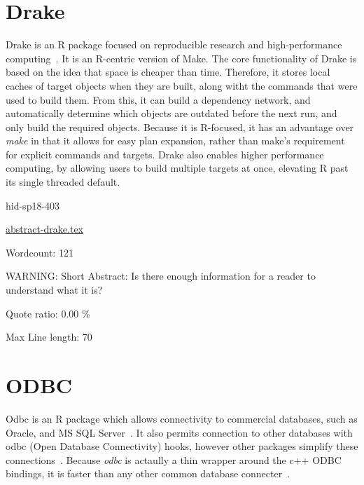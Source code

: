 \section{Drake}

Drake is an R package focused on reproducible research and
high-performance computing~\cite{hid-sp18-403-R-drake}. It is an
R-centric version of Make. The core functionality of Drake is based on
the idea that space is cheaper than time.  Therefore, it stores local
caches of target objects when they are built, along witht the commands
that were used to build them. From this, it can build a dependency
network, and automatically determine which objects are outdated before
the next run, and only build the required objects. Because it is
R-focused, it has an advantage over \textit{make} in that it allows
for easy plan expansion, rather than make’s requirement for explicit
commands and targets.  Drake also enables higher performance
computing, by allowing users to build multiple targets at once,
elevating R past its single threaded default.


\begin{IU}

hid-sp18-403

\href{https://github.com/cloudmesh-community/hid-sp18-403/blob/master//technology/abstract-drake.tex}{abstract-drake.tex}

 

Wordcount: 121

WARNING: Short Abstract: Is there enough information for a reader to understand what it is?


Quote ratio: 0.00 \%
 
Max Line length: 70
\end{IU}

\section{ODBC}

Odbc is an R package which allows connectivity to commercial
databases, such as Oracle, and MS SQL
Server~\cite{hid-sp18-403-R-odbc}. It also permits connection to other
databases with odbc  (Open Database Connectivity) hooks, however other
packages simplify these connections~\cite{hid-sp18-403-R-dbi}.
Because \textit{odbc} is actaully a thin wrapper around the c++ ODBC
bindings, it is faster than any other common database
connecter~\cite{hid-sp18-403-rstudio-odbc}.


